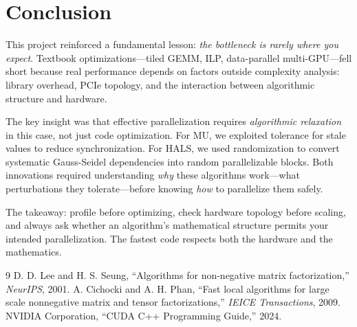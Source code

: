 \documentclass[11pt]{article}
\begin{document}
\section{Conclusion}

This project reinforced a fundamental lesson: \textit{the bottleneck is rarely where you expect}. Textbook optimizations---tiled GEMM, ILP, data-parallel multi-GPU---fell short because real performance depends on factors outside complexity analysis: library overhead, PCIe topology, and the interaction between algorithmic structure and hardware.

The key insight was that effective parallelization requires \textit{algorithmic relaxation} in this case, not just code optimization. For MU, we exploited tolerance for stale values to reduce synchronization. For HALS, we used randomization to convert systematic Gauss-Seidel dependencies into random parallelizable blocks. Both innovations required understanding \textit{why} these algorithms work---what perturbations they tolerate---before knowing \textit{how} to parallelize them safely.

The takeaway: profile before optimizing, check hardware topology before scaling, and always ask whether an algorithm's mathematical structure permits your intended parallelization. The fastest code respects both the hardware and the mathematics.

\begin{thebibliography}{9}
 D. D. Lee and H. S. Seung, ``Algorithms for non-negative matrix factorization,'' \textit{NeurIPS}, 2001.
 A. Cichocki and A. H. Phan, ``Fast local algorithms for large scale nonnegative matrix and tensor factorizations,'' \textit{IEICE Transactions}, 2009.
 NVIDIA Corporation, ``CUDA C++ Programming Guide,'' 2024.
\end{thebibliography}
\end{document}
